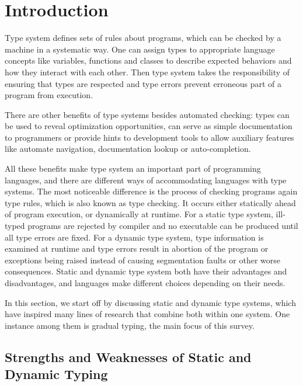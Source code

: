 

\section{Introduction}


Type system defines sets of rules about programs, which can be checked by a machine
in a systematic way.
One can assign types to appropriate language concepts like
variables, functions and classes to describe expected behaviors
and how they interact with each other.
Then type system takes the responsibility of ensuring that types are respected and
type errors prevent erroneous part of a program from execution.

There are other benefits of type systems besides automated checking:
types can be used to reveal optimization opportunities,
can serve as simple documentation to programmers or
provide hints to development tools to allow auxiliary features like
automate navigation, documentation lookup
or auto-completion.

All these benefits make type system an important part of programming languages,
and there are different ways of accommodating languages with type systems.
The most noticeable difference is the process of checking programs again type rules,
which is also known as type checking.
It occurs either statically ahead of program execution, or dynamically at runtime.
For a static type system, ill-typed programs are rejected by compiler and
no executable can be produced until all type errors are fixed.
For a dynamic type system,
type information is examined at runtime and type errors result
in abortion of the program or exceptions being raised
instead of causing segmentation faults or other worse consequences.
Static and dynamic type system both have their advantages and disadvantages,
and languages make different choices depending on their needs.

In this section, we start off by discussing static and dynamic type systems,
which have inspired many lines of research that combine both within one system.
One instance among them is gradual typing, the main focus of this survey.

\subsection{Strengths and Weaknesses of Static and Dynamic Typing}

